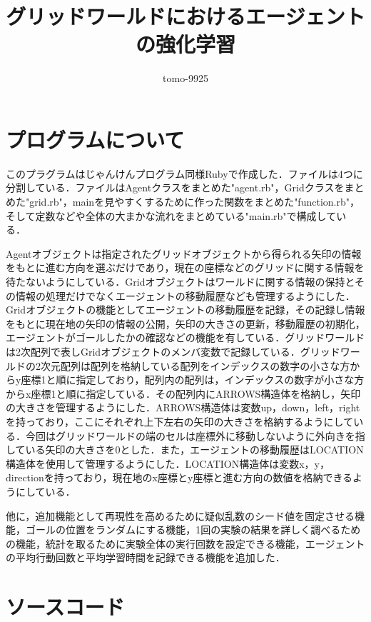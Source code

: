\documentclass[a4j,11pt]{jarticle}
\title{グリッドワールドにおけるエージェントの強化学習}
\author{tomo-9925}
\begin{document}
\maketitle

\section{プログラムについて}

このプラグラムはじゃんけんプログラム同様Rubyで作成した．ファイルは4つに分割している．ファイルはAgentクラスをまとめた"agent.rb"，Gridクラスをまとめた"grid.rb"，mainを見やすくするために作った関数をまとめた"function.rb"，そして定数などや全体の大まかな流れをまとめている"main.rb"で構成している．

Agentオブジェクトは指定されたグリッドオブジェクトから得られる矢印の情報をもとに進む方向を選ぶだけであり，現在の座標などのグリッドに関する情報を待たないようにしている．Gridオブジェクトはワールドに関する情報の保持とその情報の処理だけでなくエージェントの移動履歴なども管理するようにした．
Gridオブジェクトの機能としてエージェントの移動履歴を記録，その記録し情報をもとに現在地の矢印の情報の公開，矢印の大きさの更新，移動履歴の初期化，エージェントがゴールしたかの確認などの機能を有している．グリッドワールドは2次配列で表しGridオブジェクトのメンバ変数で記録している．グリッドワールドの2次元配列は配列を格納している配列をインデックスの数字の小さな方からy座標1と順に指定しており，配列内の配列は，インデックスの数字が小さな方からx座標1と順に指定している．その配列内にARROWS構造体を格納し，矢印の大きさを管理するようにした．ARROWS構造体は変数up，down，left，rightを持っており，ここにそれぞれ上下左右の矢印の大きさを格納するようにしている．今回はグリッドワールドの端のセルは座標外に移動しないように外向きを指している矢印の大きさを0とした．また，エージェントの移動履歴はLOCATION構造体を使用して管理するようにした．LOCATION構造体は変数x，y，directionを持っており，現在地のx座標とy座標と進む方向の数値を格納できるようにしている．

他に，追加機能として再現性を高めるために疑似乱数のシード値を固定させる機能，ゴールの位置をランダムにする機能，1回の実験の結果を詳しく調べるための機能，統計を取るために実験全体の実行回数を設定できる機能，エージェントの平均行動回数と平均学習時間を記録できる機能を追加した．

\newpage

\section{ソースコード}
\end{document}
